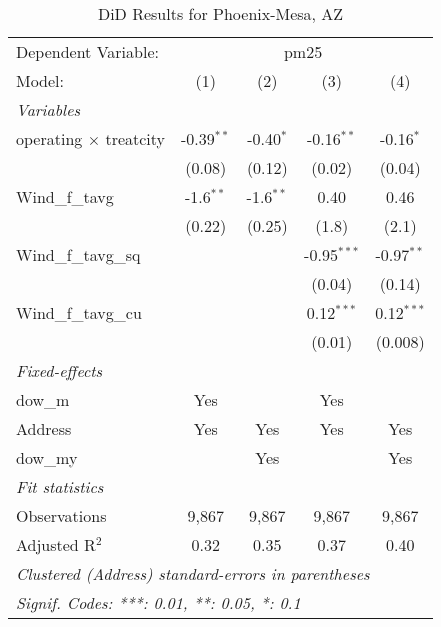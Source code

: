
\begin{table}[htbp]
   \caption{DiD Results for Phoenix-Mesa, AZ}
   \centering
   \begin{tabular}{lcccc}
      \tabularnewline \midrule \midrule
      Dependent Variable: & \multicolumn{4}{c}{pm25}\\
      Model:                        & (1)          & (2)         & (3)           & (4)\\  
      \midrule
      \emph{Variables}\\
      operating $\times$ treatcity  & -0.39$^{**}$ & -0.40$^{*}$ & -0.16$^{**}$  & -0.16$^{*}$\\   
                                    & (0.08)       & (0.12)      & (0.02)        & (0.04)\\   
      Wind\_f\_tavg                 & -1.6$^{**}$  & -1.6$^{**}$ & 0.40          & 0.46\\   
                                    & (0.22)       & (0.25)      & (1.8)         & (2.1)\\   
      Wind\_f\_tavg\_sq             &              &             & -0.95$^{***}$ & -0.97$^{**}$\\   
                                    &              &             & (0.04)        & (0.14)\\   
      Wind\_f\_tavg\_cu             &              &             & 0.12$^{***}$  & 0.12$^{***}$\\   
                                    &              &             & (0.01)        & (0.008)\\   
      \midrule
      \emph{Fixed-effects}\\
      dow\_m                        & Yes          &             & Yes           & \\  
      Address                       & Yes          & Yes         & Yes           & Yes\\  
      dow\_my                       &              & Yes         &               & Yes\\  
      \midrule
      \emph{Fit statistics}\\
      Observations                  & 9,867        & 9,867       & 9,867         & 9,867\\  
      Adjusted R$^2$                & 0.32         & 0.35        & 0.37          & 0.40\\  
      \midrule \midrule
      \multicolumn{5}{l}{\emph{Clustered (Address) standard-errors in parentheses}}\\
      \multicolumn{5}{l}{\emph{Signif. Codes: ***: 0.01, **: 0.05, *: 0.1}}\\
   \end{tabular}
\end{table}



